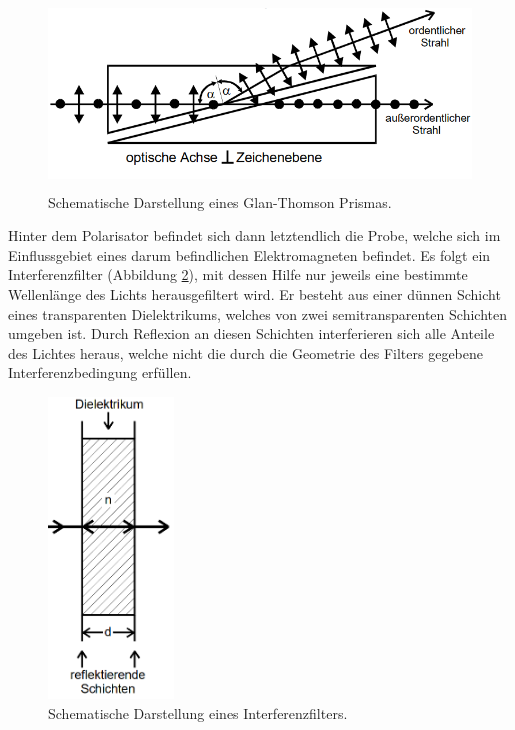 \begin{figure}[H]
  \centering
  \includegraphics[height=5cm]{Prisma.PNG}
  \caption{Schematische Darstellung eines Glan-Thomson Prismas. \cite{sample1}}
  \label{fig:prisma}
\end{figure}

Hinter dem Polarisator befindet sich dann letztendlich die Probe, welche sich im Einflussgebiet
eines darum befindlichen Elektromagneten befindet. Es folgt ein Interferenzfilter (Abbildung \ref{fig:filter}),
mit dessen Hilfe nur jeweils eine bestimmte Wellenlänge des Lichts herausgefiltert
wird. Er besteht aus einer dünnen Schicht eines transparenten Dielektrikums, welches
von zwei semitransparenten Schichten umgeben ist. Durch Reflexion an diesen Schichten
interferieren sich alle Anteile des Lichtes heraus, welche nicht die durch die Geometrie
des Filters gegebene Interferenzbedingung erfüllen.

\begin{figure}[H]
  \centering
  \includegraphics[height=8cm]{Interferenzfilter.PNG}
  \caption{Schematische Darstellung eines Interferenzfilters. \cite{sample1}}
  \label{fig:filter}
\end{figure}

